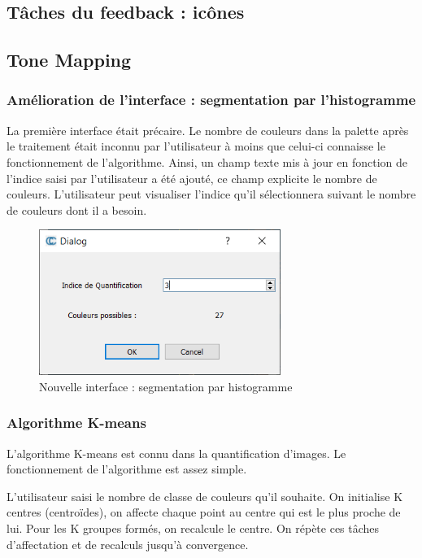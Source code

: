 \documentclass[12pt,titlepage,french]{article}
\begin{document}
\subsection{Tâches du feedback : icônes}

\subsection{Tone Mapping}

\subsubsection{Amélioration de l'interface : segmentation par l'histogramme}

La première interface était précaire.
Le nombre de couleurs dans la palette après le traitement était inconnu par l'utilisateur à moins que celui-ci connaisse le fonctionnement de l'algorithme.
Ainsi, un champ texte mis à jour en fonction de l'indice saisi par l'utilisateur a été ajouté, ce champ explicite le nombre de couleurs.
L'utilisateur peut visualiser l'indice qu'il sélectionnera suivant le nombre de couleurs dont il a besoin.

\begin{figure}[H]
 \caption{\label{} Nouvelle interface : segmentation par histogramme}
 \begin{center}
 \includegraphics[width=0.7\textwidth]{./img/HistogramDialog.PNG}
  \end{center}
\end{figure}

\subsubsection{Algorithme K-means}

L'algorithme K-means est connu dans la quantification d'images.
Le fonctionnement de l'algorithme est assez simple.

L'utilisateur saisi le nombre de classe de couleurs qu'il souhaite.
On initialise K centres (centroïdes), on affecte chaque point au centre qui est le plus proche de lui.
Pour les K groupes formés, on recalcule le centre. On répète ces tâches d'affectation et de recalculs jusqu'à convergence.
\end{document}
